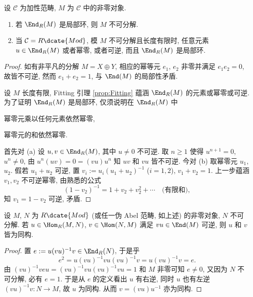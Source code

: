 \begin{lemma}\label{prop:indecomposable-mod-local}
	设 $\mathcal{C}$ 为加性范畴, $M$ 为 $\mathcal{C}$ 中的非零对象.
	\begin{enumerate}
		\item 若 $\End_R(M)$ 是局部环, 则 $M$ 不可分解.
		\item 当 $\mathcal{C} = R\dcate{Mod}$, 模 $M$ 不可分解且长度有限时, 任意元素 $u \in \End_R(M)$ 或者幂零, 或者可逆, 而且 $\End_R(M)$ 是局部环.
	\end{enumerate}
\end{lemma}
\begin{proof}
	如有非平凡的分解 $M = X \oplus Y$, 相应的幂等元 $e_1$, $e_2$ 非零并满足 $e_1 e_2 = 0$, 故皆不可逆, 然而 $e_1 + e_2 = 1$, 与 $\End(M)$ 的局部性矛盾.
	
	设 $M$ 长度有限, Fitting 引理 \ref{prop:Fitting} 蕴涵 $\End_R(M)$ 的元素或幂零或可逆. 为了证明 $\End_R(M)$ 是局部环, 仅须说明在 $\End_R(M)$ 中
	\begin{inparaenum}[(a)]
		\item 幂零元乘以任何元素依然幂零,
		\item 幂零元的和依然幂零.
	\end{inparaenum}
	首先对 (a) 设 $u, v \in \End_R(M)$, 其中 $u \neq 0$ 不可逆. 取 $n \geq 1$ 使得 $u^{n+1}=0$, $u^n \neq 0$, 由 $u^n(uv)=0=(vu)u^n$ 知 $uv$ 和 $vu$ 皆不可逆. 今对 (b) 取幂零元 $u_1$, $u_2$. 假若 $u_1 + u_2$ 可逆, 置 $v_i := u_i (u_1 + u_2)^{-1}$ ($i=1,2$), $v_1 + v_2 = 1$. 上一步蕴涵 $v_1, v_2$ 不可逆幂零, 由熟悉的公式
	\[ (1 - v_2)^{-1} = 1 + v_2 + v_2^2 + \cdots \quad \text{(有限和)}, \]
	知 $v_1 = 1 - v_2$ 可逆, 矛盾.
\end{proof}

\begin{lemma}\label{prop:indecomposable-lemma}
	设 $M$, $N$ 为 $R\dcate{Mod}$ (或任一伪 Abel 范畴, 如上述) 的非零对象, $N$ 不可分解. 若 $u \in \Hom_R(M,N)$, $v \in \Hom(N,M)$ 满足 $vu \in \End(M)$ 可逆, 则 $u$ 和 $v$ 皆为同构.
\end{lemma}
\begin{proof}
	置 $e := u(vu)^{-1}v \in \End_R(N)$, 于是乎
	\[ e^2 = u(vu)^{-1}vu(vu)^{-1}v = u(vu)^{-1}v = e. \]
	由 $(vu)^{-1}veu = (vu)^{-1}vu(vu)^{-1}vu = 1$ 和 $M$ 非零可知 $e \neq 0$, 又因为 $N$ 不可分解, 必有 $e=1$. 于是从 $e$ 的定义看出 $u$ 有右逆, 同时 $u$ 也有左逆 $(vu)^{-1}v: N \to M$, 故 $u$ 为同构. 从而 $v = (vu)u^{-1}$ 亦为同构.
\end{proof}

